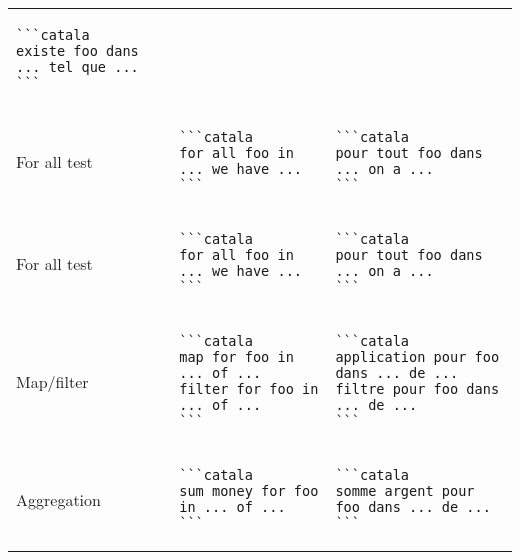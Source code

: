 \documentclass[a3paper,landscape]{article}
\begin{document}
\begin{multicols*}{2}
\begin{center}
\begin{tabular}{p{}p{}p{}}
\begin{verbatim}
```catala
existe foo dans ... tel que ...
```
\end{verbatim}
\vspace*{-1.75em}
\\
For all test&
\vspace*{-1.75em}
\begin{verbatim}
```catala
for all foo in ... we have ...
```
\end{verbatim}
\vspace*{-1.75em}
&
\vspace*{-1.75em}
\begin{verbatim}
```catala
pour tout foo dans ... on a ...
```
\end{verbatim}
\vspace*{-1.75em}
\\
For all test&
\vspace*{-1.75em}
\begin{verbatim}
```catala
for all foo in ... we have ...
```
\end{verbatim}
\vspace*{-1.75em}
&
\vspace*{-1.75em}
\begin{verbatim}
```catala
pour tout foo dans ... on a ...
```
\end{verbatim}
\vspace*{-1.75em}
\\
Map/filter&
\vspace*{-1.75em}
\begin{verbatim}
```catala
map for foo in ... of ...
filter for foo in ... of ...
```
\end{verbatim}
\vspace*{-1.75em}
&
\vspace*{-1.75em}
\begin{verbatim}
```catala
application pour foo dans ... de ...
filtre pour foo dans ... de ...
```
\end{verbatim}
\vspace*{-1.75em}
\\
Aggregation&
\vspace*{-1.75em}
\begin{verbatim}
```catala
sum money for foo in ... of ...
```
\end{verbatim}
\vspace*{-1.75em}
&
\vspace*{-1.75em}
\begin{verbatim}
```catala
somme argent pour foo dans ... de ...
```
\end{verbatim}

\end{tabular}
\end{center}
\end{multicols*}
\end{document}
